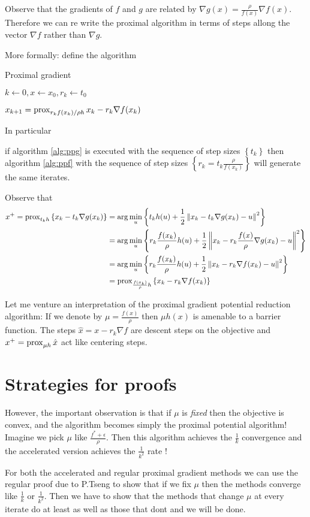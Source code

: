 \documentclass[smallextended]{svjour3}       %
\begin{document}
Observe that the gradients of $f$ and $g$ are related by $\nabla g(x) = \frac{\rho}{f(x)}\nabla f(x)$.
Therefore we can re write the proximal algorithm in terms of steps allong the vector
$\nabla f$ rather than $\nabla g$. 

More formally: define the algorithm
\begin{algorithm}{Proximal gradient}
  \caption{Proximal Gradient}
  \begin{algorithmic}
  \STATE $k \gets 0, x \gets x_0, r_k \gets t_0$

    \STATE $x_{k+1} = \operatorname{prox}_{r_kf(x_k)/\rho h}{x_k - r_k \nabla f(x_k)}$
  \ENDWHILE
  \end{algorithmic}
  \label{alg:ppf}
\end{algorithm}

In particular 
\begin{clm}
if algorithm \eqref{alg:ppg} is executed with the sequence of 
step sizes $\left\{ t_k \right\}$ then algorithm \eqref{alg:ppf} with 
the sequence of step sizes $\left\{ r_k = t_k \frac{\rho}{f(x_k)}\right\}$ will generate the same iterates.

\end{clm}
\begin{prf}
 Observe that 
 \begin{align*}
   x^+ = \operatorname{prox}_{t_kh}\left\{x_k - t_k \nabla g(x_k)\right\} & = \arg \min_u \left\{ t_kh(u) + \frac{1}{2}\left\| x_k - t_k \nabla g(x_k)-u \right\|^2 \right\} \\
   & = \arg \min_u \left\{ r_k\frac{f(x_k)}{\rho}h(u) + \frac{1}{2}\left\| x_k - r_k\frac{f(x)}{\rho} \nabla g(x_k)-u \right\|^2 \right\} \\
   & = \arg \min_u \left\{ r_k\frac{f(x_k)}{\rho}h(u) + \frac{1}{2}\left\| x_k - r_k\nabla f(x_k)-u \right\|^2 \right\} \\
   & = \operatorname{prox}_{\frac{f(x_k)}{\rho}h}\left\{x_k - r_k\nabla f(x_k)\right\}
 \end{align*} 
 \end{prf} 

 Let me venture an interpretation of the proximal gradient potential reduction algorithm:
 If we denote by $\mu = \frac{f(x)}{\rho}$ then $\mu h(x)$ is amenable to a barrier function. 
 The steps $\hat x = x - r_k\nabla f$ are descent steps on the objective and $x^+ = \operatorname{prox}_{\mu h}{\hat x}$ act
 like centering steps.


 \section{Strategies for proofs}
 However, the important observation is that if $\mu$ is {\em fixed} then the
 objective is convex, and the algorithm becomes simply the proximal potential
 algorithm! Imagine we pick $\mu$ like $\frac{f^*+\epsilon}{\rho}$.  Then this
 algorithm achieves the $\frac{1}{k}$ convergence and the accelerated version
 achieves the $\frac{1}{k^2}$ rate !

 For both the accelerated and regular proximal gradient methods we can use the
 regular proof due to P.Tseng to show that if we fix $\mu$ then the methods
 converge like $\frac{1}{k}$ or $\frac{1}{k^2}$.  Then we have to show that the
 methods that change $\mu$ at every iterate do at least as well as those that
 dont and we will be done.
\end{document}
